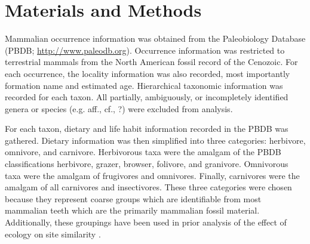 \documentclass[12pt,letterpaper]{article}
\begin{document}
%
%
%


\section{Materials and Methods}
Mammalian occurrence information was obtained from the Paleobiology Database (PBDB; \url{http://www.paleodb.org}). Occurrence information was restricted to terrestrial mammals from the North American fossil record of the Cenozoic. For each occurrence, the locality information was also recorded, most importantly formation name and estimated age. Hierarchical taxonomic information was recorded for each taxon. All partially, ambiguously, or incompletely identified genera or species (e.g. aff., cf., ?) were excluded from analysis. 


For each taxon, dietary and life habit information recorded in the PBDB was gathered. Dietary information was then simplified into three categories: herbivore, omnivore, and carnivore. Herbivorous taxa were the amalgam of the PBDB classifications herbivore, grazer, browser, folivore, and granivore. Omnivorous taxa were the amalgam of frugivores and omnivores. Finally, carnivores were the amalgam of all carnivores and insectivores. These three categories were chosen because they represent coarse groups which are identifiable from most mammalian teeth which are the primarily mammalian fossil material. Additionally, these groupings have been used in prior analysis of the effect of ecology on site similarity \citep{Jernvall2004}.
\end{document}
